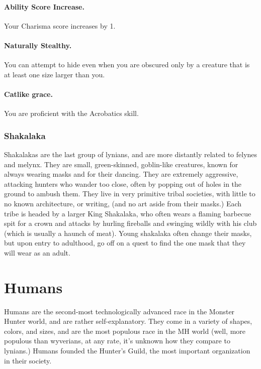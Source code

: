 \paragraph{Ability Score Increase.} Your Charisma score increases by 1.

\paragraph{Naturally Stealthy.} You can attempt to hide even when you are obscured only by a creature that is at least one size larger than you.

\paragraph{Catlike grace.} You are proficient with the Acrobatics skill.

\subsubsection*{Shakalaka}



Shakalakas are the last group of lynians, and are more distantly related to felynes and melynx.  They are small, green-skinned, goblin-like creatures, known for always wearing masks and for their dancing. They are extremely aggressive, attacking hunters who wander too close, often by popping out of holes in the ground to ambush them.  They live in very primitive tribal societies, with little to no known architecture, or writing, (and no art aside from their masks.) Each tribe is headed by a larger King Shakalaka, who often wears a flaming barbecue spit for a crown and attacks by hurling fireballs and swinging wildly with his club (which is usually a haunch of meat).  Young shakalaka often change their masks, but upon entry to adulthood, go off on a quest to find the one mask that they will wear as an adult.

\section{Humans}

Humans are the second-most technologically advanced race in the Monster Hunter world, and are rather self-explanatory. They come in a variety of shapes, colors, and sizes, and are the most populous race in the MH world (well, more populous than wyverians, at any rate, it's unknown how they compare to lynians.) Humans founded the Hunter's Guild, the most important organization in their society.

